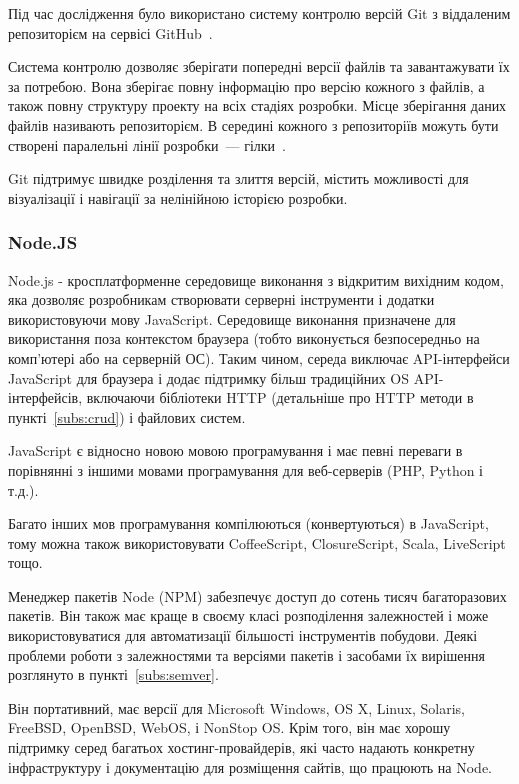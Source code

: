 Під час дослідження було використано систему контролю версій Git з віддаленим репозиторієм на сервісі GitHub~\cite{gCalShedule}.

Система контролю дозволяє зберігати попередні версії файлів та завантажувати їх за потребою. Вона зберігає повну інформацію про версію кожного з файлів, а також повну структуру проекту на всіх стадіях розробки. Місце зберігання даних файлів називають репозиторієм. В середині кожного з репозиторіїв можуть бути створені паралельні лінії розробки~--- гілки~\cite{loeliger2012version}.

Git підтримує швидке розділення та злиття версій, містить можливості для візуалізації і навігації за нелінійною історією розробки. 


\subsubsection{Node.JS}

Node.js - кросплатформенне середовище виконання з відкритим вихідним кодом, яка дозволяє розробникам створювати серверні інструменти і додатки використовуючи мову JavaScript. Середовище виконання призначене для використання поза контекстом браузера (тобто виконується безпосередньо на комп'ютері або на серверній ОС). Таким чином, середа виключає API-інтерфейси JavaScript для браузера і додає підтримку більш традиційних OS API-інтерфейсів, включаючи бібліотеки HTTP (детальніше про HTTP методи в пункті~\ref{subs:crud}) і файлових систем.

JavaScript є відносно новою мовою програмування і має певні переваги в порівнянні з іншими мовами програмування для веб-серверів (PHP, Python і т.д.).

Багато інших мов програмування компілюються (конвертуються) в JavaScript, тому можна також використовувати CoffeeScript, ClosureScript, Scala, LiveScript тощо.

Менеджер пакетів Node (NPM) забезпечує доступ до сотень тисяч багаторазових пакетів. Він також має краще в своєму класі розподілення залежностей і може використовуватися для автоматизації більшості інструментів побудови. Деякі проблеми роботи з залежностями та версіями пакетів і засобами їх вирішення розглянуто в пункті~\ref{subs:semver}. 

Він портативний, має версії для Microsoft Windows, OS X, Linux, Solaris, FreeBSD, OpenBSD, WebOS, і NonStop OS. Крім того, він має хорошу підтримку серед багатьох хостинг-провайдерів, які часто надають конкретну інфраструктуру і документацію для розміщення сайтів, що працюють на Node.

